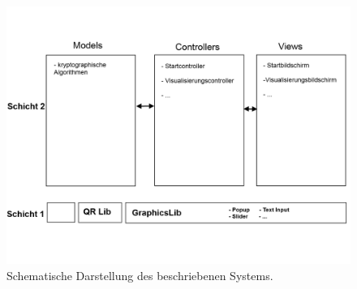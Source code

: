 \documentclass{article}
\begin{document}
\begin{figure}[h!]
  \centering
    \includegraphics[width=\textwidth]{resources/systemmodel-draft}
  \caption{Schematische Darstellung des beschriebenen Systems.}
\end{figure}
\end{document}
